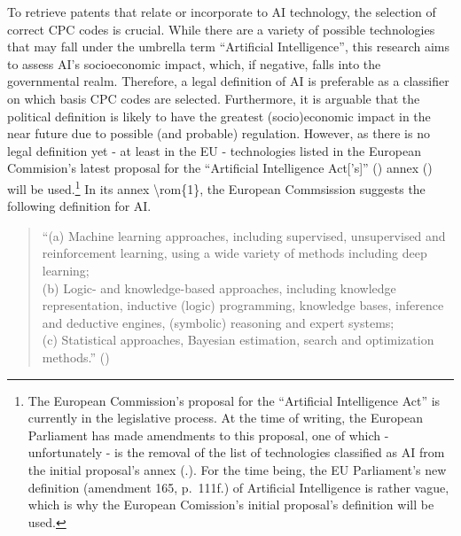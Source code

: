\documentclass[
  11,
  a4paperpaper,
]{article}
\begin{document}
To retrieve patents that relate or incorporate to AI technology, the
selection of correct CPC codes is crucial. While there are a variety of
possible technologies that may fall under the umbrella term ``Artificial
Intelligence'', this research aims to assess AI's socioeconomic impact,
which, if negative, falls into the governmental realm. Therefore, a
legal definition of AI is preferable as a classifier on which basis CPC
codes are selected. Furthermore, it is arguable that the political
definition is likely to have the greatest (socio)economic impact in the
near future due to possible (and probable) regulation. However, as there
is no legal definition yet - at least in the EU - technologies listed in
the European Commision's latest proposal for the ``Artificial
Intelligence Act{[}'s{]}''
() annex () will be used.\footnote{The European Commission's
  proposal for the ``Artificial Intelligence Act'' is currently in the
  legislative process. At the time of writing, the European Parliament
  has made amendments to this proposal, one of which - unfortunately -
  is the removal of the list of technologies classified as AI from the
  initial proposal's annex
  (.). For the time being, the EU Parliament's new
  definition (amendment 165, p.~111f.) of Artificial Intelligence is
  rather vague, which is why the European Comission's initial proposal's
  definition will be used.} In its annex \textbackslash rom\{1\}, the
European Commsission suggests the following definition for AI.


\begin{quote}
``(a) Machine learning approaches, including supervised, unsupervised
and reinforcement learning, using a wide variety of methods including
deep learning;\\
(b) Logic- and knowledge-based approaches, including knowledge
representation, inductive (logic) programming, knowledge bases,
inference and deductive engines, (symbolic) reasoning and expert
systems;\\
(c) Statistical approaches, Bayesian estimation, search and optimization
methods.'' ()
\end{quote}

\end{document}
